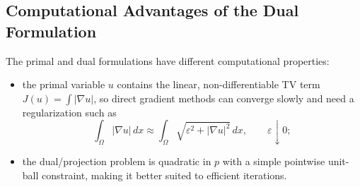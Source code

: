 \documentclass[11pt]{article}
\newcommand{\Om}{\Omega}
\theoremstyle{definition}
\theoremstyle{plain}
\begin{document}
\subsection{Computational Advantages of the Dual Formulation}
The primal and dual formulations have different computational properties:
\begin{itemize}
\item the primal variable $u$ contains the linear, non-differentiable TV term $J(u)=\int|\nabla u|$, so direct gradient methods can converge slowly and need a regularization such as
\[
\int_{\Om}|\nabla u|\,dx
\approx
\int_{\Om}\sqrt{\varepsilon^2+|\nabla u|^2}\,dx,
\qquad \varepsilon\downarrow0;
\]
\item the dual/projection problem is quadratic in $p$ with a simple pointwise unit-ball constraint, making it better suited to efficient iterations.
\end{itemize}

\end{document}
